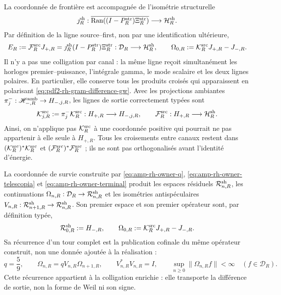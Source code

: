 La coordonnée de frontière est accompagnée de l'isométrie structurelle
\[
 \jmath_R^{\rm sh}:
 \overline{\operatorname{Ran}((I-P_R^{\rm str})\Xi_R^{\rm str})}
 \longrightarrow\mathcal H_R^{\rm sh}.
\]
Par définition de la ligne source--first, non par une identification ultérieure,
\begin{equation}\label{eq:pdf2-rh-source-state-output}
 E_R:=\mathcal F_R^{\rm src}J_{+,R}
     =\jmath_R^{\rm sh}(I-P_R^{\rm str})\Xi_R^{\rm str}:
 \mathcal D_R\longrightarrow\mathcal H_R^{\rm sh},
 \qquad
 \Omega_{0,R}:=\mathcal K_R^{\rm src}J_{+,R}-J_{-,R}.
\end{equation}
Il n'y a pas une colligation par canal : la même ligne reçoit simultanément les
horloges premier--puissance, l'intégrale gamma, le mode scalaire et les deux lignes
polaires. En particulier, elle conserve tous les produits croisés qui apparaissent en
polarisant \eqref{eq:pdf2-rh-gram-difference-gw}.
Avec les projections ambiantes \(\pi_j^-:\mathscr H_{-,R}^{\rm amb}
\to H_{-,j,R}\), les lignes de sortie correctement typées sont
\begin{equation}\label{eq:pdf2-rh-bloques-coligacion}
 \mathcal K_{j,R}^{\rm src}
 :=\pi_j^-\mathcal K_R^{\rm src}:
 H_{+,R}\longrightarrow H_{-,j,R},
 \qquad
 \mathcal F_R^{\rm src}:H_{+,R}\longrightarrow\mathcal H_R^{\rm sh}.
\end{equation}
Ainsi, on n'applique pas \(\mathcal K_R^{\rm src}\) à une coordonnée positive qui
pourrait ne pas appartenir à elle seule à \(H_{+,R}\). Tous les croisements entre
canaux restent dans
\((\mathcal K_R^{\rm src})^*\mathcal K_R^{\rm src}\) et
\((\mathcal F_R^{\rm src})^*\mathcal F_R^{\rm src}\) ; ils ne sont pas orthogonalisés
avant l'identité d'énergie.

La coordonnée de survie construite par
\eqref{eq:amp-rh-owner-q}, \eqref{eq:amp-rh-owner-telescopia} et
\eqref{eq:amp-rh-owner-terminal} produit les espaces résiduels
\(\mathcal R_{n,R}^{\rm sh}\), les continuations
\(\Omega_{n,R}:\mathcal D_R\to\mathcal R_{n,R}^{\rm sh}\) et les isométries
antispéculaires
\(V_{n,R}:\mathcal R_{n+1,R}^{\rm sh}\to\mathcal R_{n,R}^{\rm sh}\). Son
premier espace et son premier opérateur sont, par définition typée,
\[
 \mathcal R_{0,R}^{\rm sh}:=H_{-,R},\qquad
 \Omega_{0,R}:=\mathcal K_R^{\rm src}J_{+,R}-J_{-,R}.
\]
Sa récurrence d'un tour complet est la publication cofinale du même
opérateur construit, non une donnée ajoutée à la réalisation :
\begin{equation}\label{eq:pdf2-rh-recurrencia-residual}
 q=\frac59,\qquad
 \Omega_{n,R}=qV_{n,R}\Omega_{n+1,R},
 \qquad V_{n,R}^*V_{n,R}=I,
 \qquad
 \sup_{n\geq0}\|\Omega_{n,R}f\|<\infty
 \quad(f\in\mathcal D_R).
\end{equation}
Cette récurrence appartient à la colligation enrichie : elle transporte la
différence de sortie, non la forme de Weil ni son signe.

